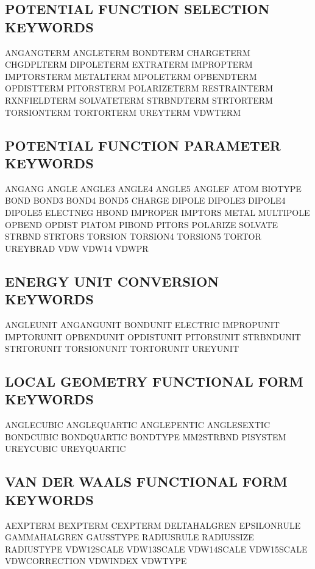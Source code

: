 \documentclass[letterpaper,11pt,english]{sphinxmanual}
\begin{document}
\subsection{POTENTIAL FUNCTION SELECTION KEYWORDS}
\label{\detokenize{text/keywords:potential-function-selection-keywords}}
ANGANGTERM      ANGLETERM       BONDTERM
CHARGETERM      CHGDPLTERM      DIPOLETERM
EXTRATERM       IMPROPTERM      IMPTORSTERM
METALTERM       MPOLETERM       OPBENDTERM
OPDISTTERM      PITORSTERM      POLARIZETERM
RESTRAINTERM    RXNFIELDTERM    SOLVATETERM
STRBNDTERM      STRTORTERM      TORSIONTERM
TORTORTERM      UREYTERM        VDWTERM


\subsection{POTENTIAL FUNCTION PARAMETER KEYWORDS}
\label{\detokenize{text/keywords:potential-function-parameter-keywords}}
ANGANG  ANGLE   ANGLE3
ANGLE4  ANGLE5  ANGLEF
ATOM    BIOTYPE BOND
BOND3   BOND4   BOND5
CHARGE  DIPOLE  DIPOLE3
DIPOLE4 DIPOLE5 ELECTNEG
HBOND   IMPROPER        IMPTORS
METAL   MULTIPOLE       OPBEND
OPDIST  PIATOM  PIBOND
PITORS  POLARIZE        SOLVATE
STRBND  STRTORS TORSION
TORSION4        TORSION5        TORTOR
UREYBRAD        VDW     VDW14
VDWPR


\subsection{ENERGY UNIT CONVERSION KEYWORDS}
\label{\detokenize{text/keywords:energy-unit-conversion-keywords}}
ANGLEUNIT       ANGANGUNIT      BONDUNIT
ELECTRIC        IMPROPUNIT      IMPTORUNIT
OPBENDUNIT      OPDISTUNIT      PITORSUNIT
STRBNDUNIT      STRTORUNIT      TORSIONUNIT
TORTORUNIT      UREYUNIT


\subsection{LOCAL GEOMETRY FUNCTIONAL FORM KEYWORDS}
\label{\detokenize{text/keywords:local-geometry-functional-form-keywords}}
ANGLE\sphinxhyphen{}CUBIC     ANGLE\sphinxhyphen{}QUARTIC   ANGLE\sphinxhyphen{}PENTIC
ANGLE\sphinxhyphen{}SEXTIC    BOND\sphinxhyphen{}CUBIC      BOND\sphinxhyphen{}QUARTIC
BONDTYPE        MM2\sphinxhyphen{}STRBND      PISYSTEM
UREY\sphinxhyphen{}CUBIC      UREY\sphinxhyphen{}QUARTIC


\subsection{VAN DER WAALS FUNCTIONAL FORM KEYWORDS}
\label{\detokenize{text/keywords:van-der-waals-functional-form-keywords}}
A\sphinxhyphen{}EXPTERM       B\sphinxhyphen{}EXPTERM       C\sphinxhyphen{}EXPTERM
DELTA\sphinxhyphen{}HALGREN   EPSILONRULE     GAMMA\sphinxhyphen{}HALGREN
GAUSSTYPE       RADIUSRULE      RADIUSSIZE
RADIUSTYPE      VDW\sphinxhyphen{}12\sphinxhyphen{}SCALE    VDW\sphinxhyphen{}13\sphinxhyphen{}SCALE
VDW\sphinxhyphen{}14\sphinxhyphen{}SCALE    VDW\sphinxhyphen{}15\sphinxhyphen{}SCALE    VDW\sphinxhyphen{}CORRECTION
VDWINDEX        VDWTYPE
\end{document}
